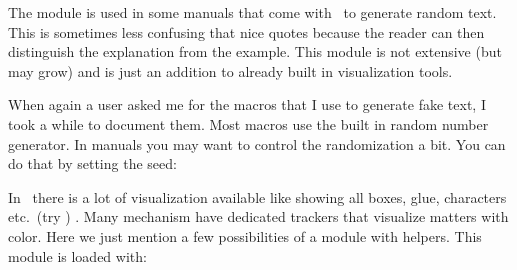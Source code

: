 
%


\startbuffer[abstract]
    The  module is used in some manuals that come with \CONTEXT\
    to generate random text. This is sometimes less confusing that nice quotes
    because the reader can then distinguish the explanation from the example.
    This module is not extensive (but may grow) and is just an addition to
    already built in visualization tools.
\stopbuffer

\startdocument
  [title={Faking Text and More},
   author=Hans Hagen,
   affiliation=PRAGMA ADE,
   date=August 2004,
   number=7 \MKIV]

\setupindenting[medium] \indenting[always] \setupwhitespace[none]

\subject{Remark}

When again a user asked me for the macros that I use to generate fake text, I
took a while to document them. Most macros use the built in random number
generator. In manuals you may want to control the randomization a bit. You can do
that by setting the seed:

\starttyping
\setupystem[random=12345]
\stoptyping


In \MKIV\ there is a lot of visualization available like showing all boxes, glue,
characters etc.\ (try \type {\showmakeup}) . Many mechanism have dedicated
trackers that visualize matters with color. Here we just mention a few
possibilities of a module with helpers. This module is loaded with:

